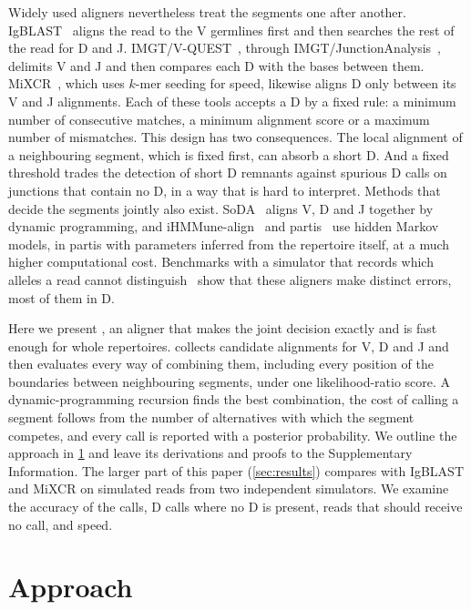 \documentclass[11pt,a4paper]{article}
\begin{document}
Widely used aligners nevertheless treat the segments one after another.
IgBLAST~\cite{ye2013igblast} aligns the read to the V germlines first and
then searches the rest of the read for D and J.
IMGT/V-QUEST~\cite{brochet2008vquest}, through
IMGT/JunctionAnalysis~\cite{yousfimonod2004junction}, delimits V and J and
then compares each D with the bases between them.
MiXCR~\cite{bolotin2015mixcr}, which uses $k$-mer seeding for speed,
likewise aligns D only between its V and J alignments. Each of these tools
accepts a D by a fixed rule: a minimum number of consecutive matches, a
minimum alignment score or a maximum number of mismatches. This design has
two consequences. The local alignment of a neighbouring segment, which is
fixed first, can absorb a short D. And a fixed threshold trades the
detection of short D remnants against spurious D calls on junctions that
contain no D, in a way that is hard to interpret. Methods that decide the
segments jointly also exist. SoDA~\cite{volpe2006soda} aligns V, D and J
together by dynamic programming, and iHMMune-align~\cite{gaeta2007ihmmune}
and partis~\cite{ralph2016partis} use hidden Markov models, in partis with
parameters inferred from the repertoire itself, at a much higher
computational cost. Benchmarks with a simulator that records which alleles a
read cannot distinguish~\cite{konstantinovsky2024genairr} show that these
aligners make distinct errors, most of them in D.

Here we present \swig, an aligner that makes the joint decision exactly and
is fast enough for whole repertoires. \swig{} collects candidate alignments
for V, D and J and then evaluates every way of combining them, including
every position of the boundaries between neighbouring segments, under one
likelihood-ratio score. A dynamic-programming recursion finds the best
combination, the cost of calling a segment follows from the number of
alternatives with which the segment competes, and every call is reported
with a posterior probability.
We outline the approach in \cref{sec:overview} and leave its derivations and
proofs to the Supplementary Information. The larger part of this paper
(\cref{sec:results}) compares \swig{} with IgBLAST and MiXCR on simulated
reads from two independent simulators. We examine the accuracy of the calls,
D calls where no D is present, reads that should receive no call, and speed.

\section{Approach}
\label{sec:overview}
\end{document}
